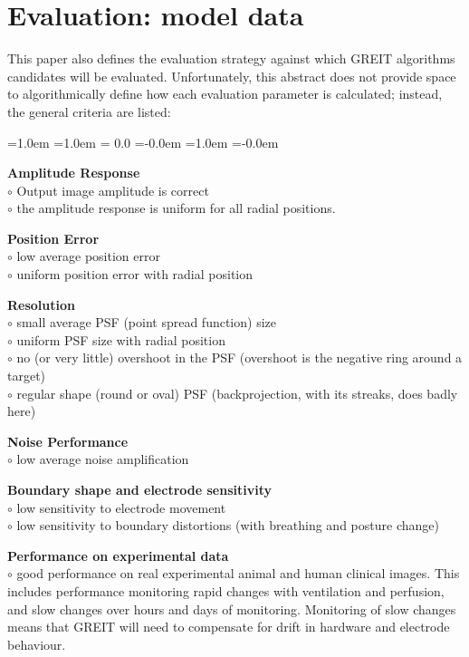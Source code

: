\documentclass[letterpaper,twocolumn,10pt]{article}
\begin{document}
\section{Evaluation: model data}

This paper also defines the evaluation strategy
against which GREIT algorithms candidates will
be evaluated. Unfortunately, this abstract
does not provide space to algorithmically
define how each evaluation parameter is calculated;
instead, the general criteria are listed:

\begin{list}{\bf {}.}
  {\leftmargin=1.0em \itemindent=1.0em
    \topsep= 0.0\baselineskip
    \itemsep=-0.0em
    \listparindent=1.0em \parsep=-0.0em
    }

\item {\bf Amplitude Response}
\\ \noindent $\circ$
  Output image amplitude is correct
\\ \noindent $\circ$ 
  the amplitude response is uniform for all radial positions.

\item {\bf Position Error}
\\ \noindent $\circ$
  low average position error
\\ \noindent $\circ$
  uniform position error with radial position

\item {\bf Resolution}
\\ \noindent $\circ$
      small average PSF (point spread function) size
\\ \noindent $\circ$
      uniform PSF size with radial position
\\ \noindent $\circ$
      no (or very little) overshoot in the PSF
  (overshoot is the negative ring around a target)
\\ \noindent $\circ$
      regular shape (round or oval) PSF
  (backprojection, with its streaks, does badly here)

\item {\bf Noise Performance}
\\ \noindent $\circ$
         low average noise amplification

\item {\bf Boundary shape and electrode sensitivity}
\\ \noindent $\circ$
      low sensitivity to electrode movement
\\ \noindent $\circ$
      low sensitivity to boundary distortions
         (with breathing and posture change)

\item {\bf Performance on experimental data}
\\ \noindent $\circ$
 good performance on real experimental animal
    and human clinical images. This includes performance
    monitoring rapid changes with ventilation and perfusion,
    and slow changes over hours and days of monitoring.
    Monitoring of slow changes means that GREIT will need
    to compensate for drift in hardware and electrode
    behaviour.
\end{list}
\end{document}
